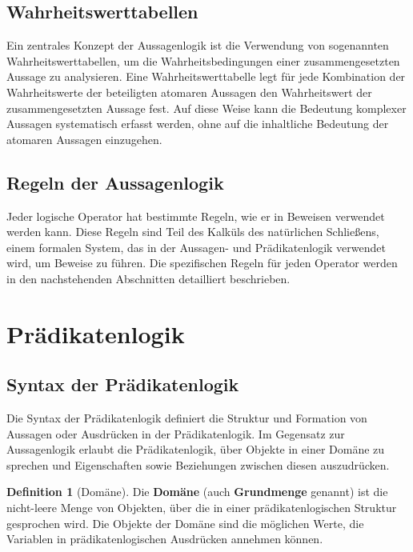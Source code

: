 \documentclass{book}
\theoremstyle{plain}
\theoremstyle{remark}
\theoremstyle{definition}
\newtheorem{definition}{Definition}[section]
\begin{document}
\subsection{Wahrheitswerttabellen}

Ein zentrales Konzept der Aussagenlogik ist die Verwendung von sogenannten Wahrheitswerttabellen, um die Wahrheitsbedingungen einer zusammengesetzten Aussage zu analysieren. Eine Wahrheitswerttabelle legt für jede Kombination der Wahrheitswerte der beteiligten atomaren Aussagen den Wahrheitswert der zusammengesetzten Aussage fest. Auf diese Weise kann die Bedeutung komplexer Aussagen systematisch erfasst werden, ohne auf die inhaltliche Bedeutung der atomaren Aussagen einzugehen.

\subsection{Regeln der Aussagenlogik}

Jeder logische Operator hat bestimmte Regeln, wie er in Beweisen verwendet werden kann. Diese Regeln sind Teil des Kalküls des natürlichen Schließens, einem formalen System, das in der Aussagen- und Prädikatenlogik verwendet wird, um Beweise zu führen. Die spezifischen Regeln für jeden Operator werden in den nachstehenden Abschnitten detailliert beschrieben.

\section{Prädikatenlogik}
\subsection{Syntax der Prädikatenlogik}

Die Syntax der Prädikatenlogik definiert die Struktur und Formation von Aussagen oder Ausdrücken in der Prädikatenlogik. Im Gegensatz zur Aussagenlogik erlaubt die Prädikatenlogik, über Objekte in einer Domäne zu sprechen und Eigenschaften sowie Beziehungen zwischen diesen auszudrücken.

\begin{definition}[Domäne]
Die \textbf{Domäne} (auch \textbf{Grundmenge} genannt) ist die nicht-leere Menge von Objekten, über die in einer prädikatenlogischen Struktur gesprochen wird. Die Objekte der Domäne sind die möglichen Werte, die Variablen in prädikatenlogischen Ausdrücken annehmen können.
\end{definition}
\end{document}
